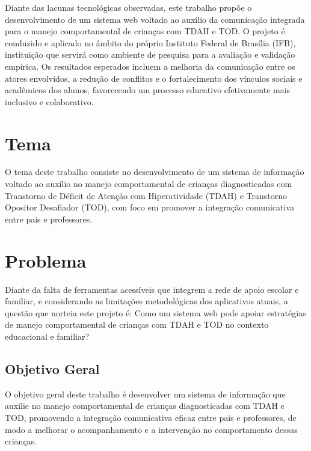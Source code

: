 Diante das lacunas tecnológicas observadas, este trabalho propõe o desenvolvimento de um sistema web voltado ao auxílio da comunicação integrada para o manejo comportamental de crianças com TDAH e TOD. O projeto é conduzido e aplicado no âmbito do próprio Instituto Federal de Brasília (IFB), instituição que servirá como ambiente de pesquisa para a avaliação e validação empírica. Os resultados esperados incluem a melhoria da comunicação entre os atores envolvidos, a redução de conflitos e o fortalecimento dos vínculos sociais e acadêmicos dos alunos, favorecendo um processo educativo efetivamente mais inclusivo e colaborativo.

\vspace{0.3cm}
\section{Tema}

O tema deste trabalho consiste no desenvolvimento de um sistema de informação voltado ao auxílio no manejo comportamental de crianças diagnosticadas com Transtorno de Déficit de Atenção com Hiperatividade (TDAH) e Transtorno Opositor Desafiador (TOD), com foco em promover a integração comunicativa entre pais e professores.

\vspace{0.3cm}
\section{Problema}

Diante da falta de ferramentas acessíveis que integrem a rede de apoio escolar e familiar, e considerando as limitações metodológicas dos aplicativos atuais, a questão que norteia este projeto é: Como um sistema web pode apoiar estratégias de manejo comportamental de crianças com TDAH e TOD no contexto educacional e familiar?

\vspace{0.3cm}
\subsection{Objetivo Geral}

O objetivo geral deste trabalho é desenvolver um sistema de informação que auxilie no manejo comportamental de crianças diagnosticadas com TDAH e TOD, promovendo a integração comunicativa eficaz entre pais e professores, de modo a melhorar o acompanhamento e a intervenção no comportamento dessas crianças.

\vspace{0.3cm}
